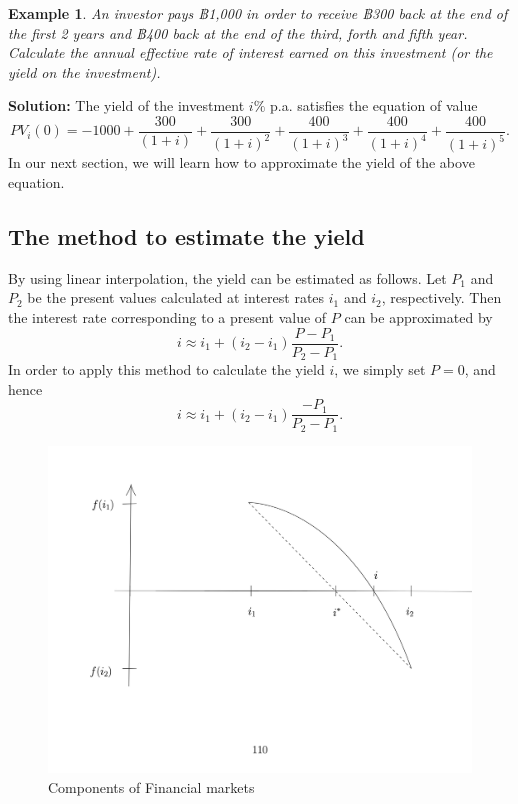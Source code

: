 \documentclass[
]{book}
\theoremstyle{definition}
\theoremstyle{definition}
\newtheorem{example}{Example}[chapter]
\theoremstyle{definition}
\theoremstyle{definition}
\theoremstyle{remark}
\begin{document}
\begin{example}
\protect\hypertarget{exm:exampleYield}{}\label{exm:exampleYield}\emph{An investor pays ฿1,000 in order to receive ฿300 back at the end of the
first 2 years and ฿400 back at the end of the third, forth and fifth
year. Calculate the annual effective rate of interest earned on this
investment (or the yield on the investment).}
\end{example}

\textbf{Solution:} The yield of the investment \(i\%\) p.a. satisfies the
equation of value
\[PV_i(0) =  -1000 + \frac{300}{(1+i)} + \frac{300}{(1+i)^{2}} + \frac{400}{(1+i)^{3}} +  \frac{400}{(1+i)^{4}} + \frac{400}{(1+i)^{5}}.\]
In our next section, we will learn how to approximate the yield of the
above equation.

\subsection{The method to estimate the yield}\label{the-method-to-estimate-the-yield}

By using linear interpolation, the yield can be estimated as follows.
Let \(P_1\) and \(P_2\) be the present values calculated at interest rates
\(i_1\) and \(i_2\), respectively. Then the interest rate corresponding to a
present value of \(P\) can be approximated by
\[i \approx i_1 + (i_2 - i_1) \frac{P - P_1}{P_2 - P_1}.\] In order to
apply this method to calculate the yield \(i\), we simply set \(P = 0\), and
hence \[i \approx i_1 + (i_2 - i_1) \frac{ - P_1}{P_2 - P_1}.\]

\begin{figure}
\centering
\includegraphics{Yield_figure.png}
\caption{Components of Financial markets}
\end{figure}
\end{document}
